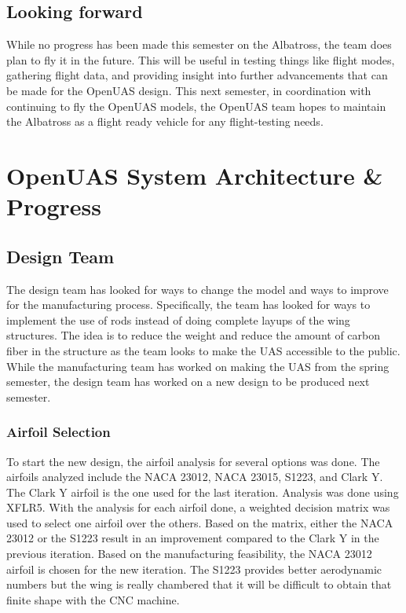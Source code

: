 \documentclass{article}
\begin{document}
\subsection{Looking forward}
While no progress has been made this semester on the Albatross, the team does plan to fly it in the future. This will be useful in testing things like flight modes, gathering flight data, and providing insight into further advancements that can be made for the OpenUAS design. This next semester, in coordination with continuing to fly the OpenUAS models, the OpenUAS team hopes to maintain the Albatross as a flight ready vehicle for any flight-testing needs.

\section{OpenUAS System Architecture \& Progress}

\subsection{Design Team}
The design team has looked for ways to change the model and ways to improve for the manufacturing process. Specifically, the team has looked for ways to implement the use of rods instead of doing complete layups of the wing structures. The idea is to reduce the weight and reduce the amount of carbon fiber in the structure as the team looks to make the UAS accessible to the public. While the manufacturing team has worked on making the UAS from the spring semester, the design team has worked on a new design to be produced next semester.

\subsubsection{Airfoil Selection}
To start the new design, the airfoil analysis for several options was done. The airfoils analyzed include the NACA 23012, NACA 23015, S1223, and Clark Y. The Clark Y airfoil is the one used for the last iteration. Analysis was done using XFLR5. With the analysis for each airfoil done, a weighted decision matrix was used to select one airfoil over the others. Based on the matrix, either the NACA 23012 or the S1223 result in an improvement compared to the Clark Y in the previous iteration. Based on the manufacturing feasibility, the NACA 23012 airfoil is chosen for the new iteration. The S1223 provides better aerodynamic numbers but the wing is really chambered that it will be difficult to obtain that finite shape with the CNC machine.
\end{document}
